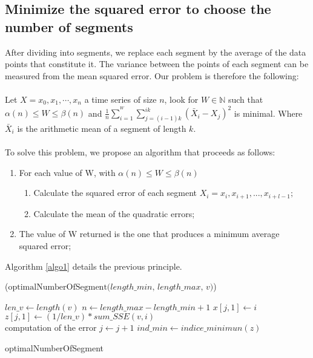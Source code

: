 \subsection{Minimize the squared error to choose the number of segments}
After dividing into segments, we replace each segment by the average of the data points that constitute it. The variance between the points of each segment can be measured from the mean squared error. Our problem is therefore the following:
\paragraph{} Let $ X = x_{0}, x_{1}, \cdots, x_{n} $ a time series of size $ n $, look for $ W \in \mathbb{N} $ such that $ \alpha(n) \leq W \leq \beta(n) $ and $ \frac{1}{n} \sum_{i = 1}^{^{W}} \sum_{j = (i-1) k}^{ik} (\bar{X}_{i} - X_{j})^{2} $ is minimal. Where $ \bar{X}_{i} $ is the arithmetic mean of a segment of length $ k $. 




\paragraph{} To solve this problem, we
propose an algorithm that proceeds as follows:
\begin{enumerate}
\item For each value of W, with $ \alpha(n) \leq W \leq \beta(n) $
\begin{enumerate}
\item Calculate the squared error of each segment
$ X_{i} = x_{i}, x_{i + 1}, ..., x_{i + l-1}; $
\item Calculate the mean of the quadratic errors;
\end{enumerate}
\item The value of W returned is the one that produces a minimum average squared error; 
\end{enumerate}

Algorithm \ref{algo1} details the previous principle.


\begin{algorithm}[h]
\DontPrintSemicolon
{}

\Begin($\text{optimalNumberOfSegment} {(} length\_min, \, length\_max, \, v{)}$)
{
  $len\_v \leftarrow length(v)$\;
  $n \leftarrow length\_max - length\_min + 1$\;
  {
    $x[j, 1] \leftarrow i$\;
    $z[j, 1] \leftarrow  (1/len\_v) * sum\_SSE(v, i)$\; \\computation of the error    
		$j \leftarrow j + 1$\;
  }
	$ind\_min \leftarrow indice\_minimun(z)$\;

}
\caption{optimalNumberOfSegment}
\label{algo1}
\end{algorithm}


